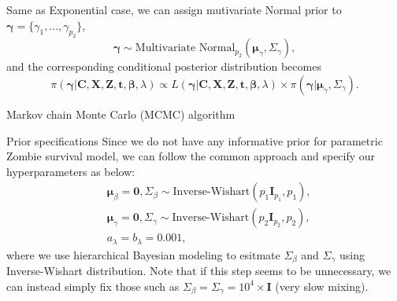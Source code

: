 \documentclass[a4paper, 12pt]{article}
\makeatletter
\renewcommand{\section}{\@startsection
	{section}    {1}    {0mm}    {-0.7\baselineskip}    {0.08\baselineskip}    {\normalfont\large\sc\center\bf}}
\renewcommand{\subsection}{\@startsection
	{subsection}    {2}    {0mm}    {-0.5\baselineskip}    {0.01\baselineskip}    {\normalfont\normalsize\itshape\center}}
\makeatother
\begin{document}
Same as Exponential case, we can assign mutivariate Normal prior to $\mathbf{\gamma}=\{\gamma_1,...,\gamma_{p_2}\}$,
\begin{equation}
\mathbf{\gamma} \sim \mbox{Multivariate Normal}_{p_2}(\mathbf{\mu}_{\gamma}, \Sigma_{\gamma}),
\end{equation}
and the corresponding conditional posterior distribution becomes 
\begin{equation}
\pi(\mathbf{\gamma}|\mathbf{C}, \mathbf{X}, \mathbf{Z}, \mathbf{t}, \mathbf{\beta}, \lambda) \propto L(\mathbf{\gamma}|\mathbf{C}, \mathbf{X}, \mathbf{Z}, \mathbf{t}, \mathbf{\beta}, \lambda)\times \pi(\mathbf{\gamma}|\mathbf{\mu}_{\gamma}, \Sigma_{\gamma}).
\end{equation}
\section{Markov chain Monte Carlo (MCMC) algorithm}
\subsection{Prior specifications}
\noindent Since we do not have any informative prior for parametric Zombie survival model, we can follow the common approach and specify our hyperparameters as below:  
\begin{equation}
\begin{aligned}
&\mathbf{\mu}_{\beta} = \mathbf{0}, \Sigma_{\beta} \sim \mbox{Inverse-Wishart}(p_1\mathbf{I}_{p_1}, p_1),\\
& \mathbf{\mu}_{\gamma} = \mathbf{0}, \Sigma_{\gamma} \sim \mbox{Inverse-Wishart}(p_2\mathbf{I}_{p_2}, p_2), \\
& a_{\lambda} =  b_{\lambda} = 0.001,
\end{aligned}
\end{equation}
where we use hierarchical Bayesian modeling to esitmate $\Sigma_{\beta}$ and $\Sigma_{\gamma}$ using Inverse-Wishart distribution. Note that if this step seems to be unnecessary, we can instead simply fix those such as $\Sigma_{\beta} =\Sigma_{\gamma} = 10^4\times\mathbf{I}$ (very slow mixing). 
\end{document}
